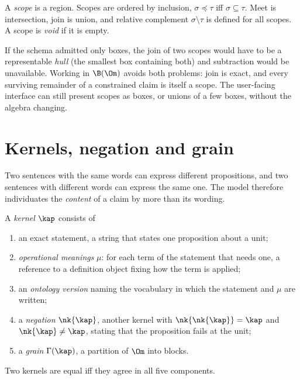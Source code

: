 \begin{definition}[Scope]
A \emph{scope} is a region. Scopes are ordered by inclusion, $\sigma\preceq\tau$ iff $\sigma\subseteq\tau$. Meet is intersection, join is union, and relative complement $\sigma\setminus\tau$ is defined for all scopes. A scope is \emph{void} if it is empty.
\end{definition}

\begin{remark}
If the schema admitted only boxes, the join of two scopes would have to be a representable \emph{hull} (the smallest box containing both) and subtraction would be unavailable. Working in $\B(\Om)$ avoids both problems: join is exact, and every surviving remainder of a constrained claim is itself a scope. The user-facing interface can still present scopes as boxes, or unions of a few boxes, without the algebra changing.
\end{remark}

\section{Kernels, negation and grain}

Two sentences with the same words can express different propositions, and two sentences with different words can express the same one. The model therefore individuates the \emph{content} of a claim by more than its wording.

\begin{definition}[Kernel]\label{def:kernel}
A \emph{kernel} $\kap$ consists of
\begin{enumerate}[label=(\roman*)]
\item an exact statement, a string that states one proposition about a unit;
\item \emph{operational meanings} $\mu$: for each term of the statement that needs one, a reference to a definition object fixing how the term is applied;
\item an \emph{ontology version} naming the vocabulary in which the statement and $\mu$ are written;
\item a \emph{negation} $\nk{\kap}$, another kernel with $\nk{\nk{\kap}}=\kap$ and $\nk{\kap}\ne\kap$, stating that the proposition fails at the unit;
\item a \emph{grain} $\Gamma(\kap)$, a partition of $\Om$ into blocks.
\end{enumerate}
Two kernels are equal iff they agree in all five components.
\end{definition}

